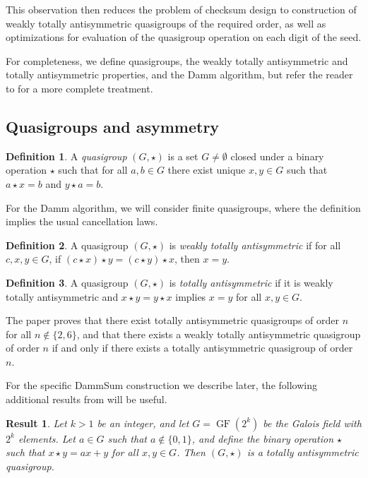 \documentclass{article}
\theoremstyle{plain}
\newtheorem{result}{Result}[section]
\theoremstyle{definition}
\newtheorem{definition}{Definition}[section]
\newcommand{\GF}{\operatorname{GF}}
\begin{document}
This observation then reduces the problem of checksum design to construction of weakly totally antisymmetric quasigroups of the required order, as well as optimizations for evaluation of the quasigroup operation on each digit of the seed.

For completeness, we define quasigroups, the weakly totally antisymmetric and totally antisymmetric properties, and the Damm algorithm, but refer the reader to \cite{damm_thesis,damm2000,damm2007} for a more complete treatment.


\subsection{Quasigroups and asymmetry}

\begin{definition}
	A \textit{quasigroup} $(G,\star)$ is a set $G \neq \emptyset$ closed under a binary operation $\star$ such that for all $a,b \in G$ there exist unique $x,y \in G$ such that $a \star x = b$ and $y \star a = b$.
\end{definition}

For the Damm algorithm, we will consider finite quasigroups, where the definition implies the usual cancellation laws.

\begin{definition}
	A quasigroup $(G,\star)$ is \textit{weakly totally antisymmetric} if for all $c,x,y \in G$, if $(c \star x) \star y = (c \star y) \star x$, then $x = y$.
\end{definition}

\begin{definition}
	A quasigroup $(G,\star)$ is \textit{totally antisymmetric} if it is weakly totally antisymmetric and $x \star y = y \star x$ implies $x = y$ for all $x,y \in G$.
\end{definition}

The paper \cite{damm2007} proves that there exist totally antisymmetric quasigroups of order $n$ for all $n \not\in \{2,6\}$, and that there exists a weakly totally antisymmetric quasigroup of order $n$ if and only if there exists a totally antisymmetric quasigroup of order $n$.

For the specific DammSum construction we describe later, the following additional results from \cite{damm2007} will be useful.

\begin{result}
	\label{result:gf_is_ta}
	Let $k > 1$ be an integer, and let $G = \GF(2^k)$ be the Galois field with $2^k$ elements.
	Let $a \in G$ such that $a \not\in \{0,1\}$, and define the binary operation $\star$ such that $x \star y = ax + y$ for all $x,y \in G$.
	Then $(G,\star)$ is a totally antisymmetric quasigroup.
\end{result}
\end{document}
